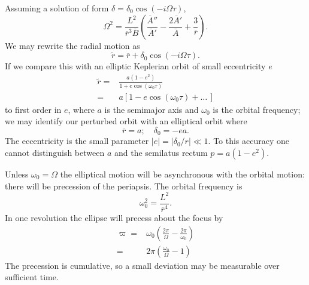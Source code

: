 Assuming a solution of form $\delta = \delta_0\cos(-i\Omega\tau)$,
\begin{equation}
\Omega^2 = \frac{L^2}{\overline{r}^3\overline{B}}\left(\frac{\overline{A}''}{\overline{A}'} - \frac{2\overline{A}'}{\overline{A}} + \frac{3}{\overline{r}}\right).
\end{equation}
We may rewrite the radial motion as
\begin{equation}
\widetilde{r} = \overline{r} + \delta_0\cos(-i\Omega\tau).
\end{equation}
If we compare this with an elliptic Keplerian orbit of small eccentricity $e$
\begin{align}
\widetilde{r} = {} & \frac{a(1 - e^2)}{1 + e\cos(\omega_0\tau)} \\
 = {} & a\left[1 - e\cos(\omega_0\tau) + \ldots \, \right]
\end{align}
to first order in $e$, where $a$ is the semimajor axis and $\omega_0$ is the orbital frequency; we may identify our perturbed orbit with an elliptical orbit where\cite{Kerner2001a}
\begin{equation}
\overline{r} = a; \quad \delta_0 = -ea.
\end{equation}
The eccentricity is the small parameter $|e| = |\delta_0/r| \ll 1$. To this accuracy one cannot distinguish between $a$ and the semilatus rectum $p = a(1 - e^2)$.

Unless $\omega_0 = \Omega$ the elliptical motion will be asynchronous with the orbital motion: there will be precession of the periapsis. The orbital frequency is
\begin{equation}
\omega_0^2 = \frac{L^2}{\overline{r}^4}.
\end{equation}
In one revolution the ellipse will precess about the focus by
\begin{align}
\varpi = {} & \omega_0\left(\frac{2\pi}{\Omega} - \frac{2\pi}{\omega_0}\right) \nonumber \\
 = {} & 2\pi\left(\frac{\omega_0}{\Omega} - 1\right)
\end{align}
The precession is cumulative, so a small deviation may be measurable over sufficient time.

